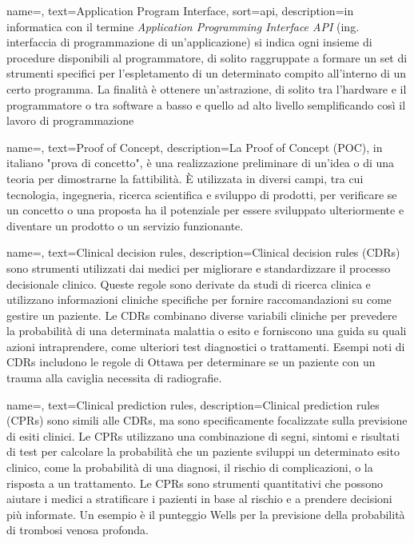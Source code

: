 
 {
    name=,
    text=Application Program Interface,
    sort=api,
    description={in informatica con il termine \emph{Application Programming Interface API} (ing. interfaccia di programmazione di un'applicazione) si indica ogni insieme di procedure disponibili al programmatore, di solito raggruppate a formare un set di strumenti specifici per l'espletamento di un determinato compito all'interno di un certo programma. La finalità è ottenere un'astrazione, di solito tra l'hardware e il programmatore o tra software a basso e quello ad alto livello semplificando così il lavoro di programmazione}
}

 {
    name=,
    text=Proof of Concept,
    description={La Proof of Concept (POC), in italiano "prova di concetto", è una realizzazione preliminare di un'idea o di una teoria per dimostrarne la fattibilità. È utilizzata in diversi campi, tra cui tecnologia, ingegneria, ricerca scientifica e sviluppo di prodotti, per verificare se un concetto o una proposta ha il potenziale per essere sviluppato ulteriormente e diventare un prodotto o un servizio funzionante.}
}

 {
    name=,
    text=Clinical decision rules,
    description={Clinical decision rules (CDRs) sono strumenti utilizzati dai medici per migliorare e standardizzare il processo decisionale clinico. Queste regole sono derivate da studi di ricerca clinica e utilizzano informazioni cliniche specifiche per fornire raccomandazioni su come gestire un paziente. Le CDRs combinano diverse variabili cliniche per prevedere la probabilità di una determinata malattia o esito e forniscono una guida su quali azioni intraprendere, come ulteriori test diagnostici o trattamenti. Esempi noti di CDRs includono le regole di Ottawa per determinare se un paziente con un trauma alla caviglia necessita di radiografie.}
}

 {
    name=,
    text=Clinical prediction rules,
    description={Clinical prediction rules (CPRs) sono simili alle CDRs, ma sono specificamente focalizzate sulla previsione di esiti clinici. Le CPRs utilizzano una combinazione di segni, sintomi e risultati di test per calcolare la probabilità che un paziente sviluppi un determinato esito clinico, come la probabilità di una diagnosi, il rischio di complicazioni, o la risposta a un trattamento. Le CPRs sono strumenti quantitativi che possono aiutare i medici a stratificare i pazienti in base al rischio e a prendere decisioni più informate. Un esempio è il punteggio Wells per la previsione della probabilità di trombosi venosa profonda.}
}

